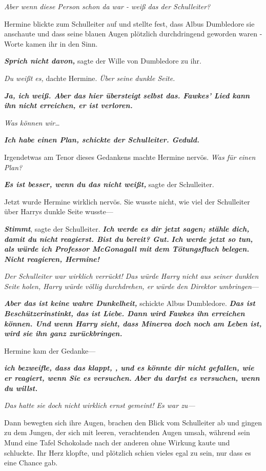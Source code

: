 {\emph{Aber wenn diese Person schon da war - weiß das der Schulleiter?}

Hermine blickte zum Schulleiter auf und stellte fest, dass Albus Dumbledore sie anschaute und dass seine blauen Augen plötzlich durchdringend geworden waren - Worte kamen ihr in den Sinn.

\textbf{\emph{Sprich nicht davon,}} sagte der Wille von Dumbledore zu ihr.

\emph{Du weißt es,} dachte Hermine. \emph{Über seine dunkle Seite.}

\textbf{\emph{Ja, ich weiß. Aber das hier übersteigt selbst das. Fawkes' Lied kann ihn nicht erreichen, er ist verloren.}}

\emph{Was können wir…}

\textbf{\emph{Ich habe einen Plan, schickte der Schulleiter. Geduld.}}

Irgendetwas am Tenor dieses Gedankens machte Hermine nervös. \emph{Was für einen Plan?}

\textbf{\emph{Es ist besser, wenn du das nicht weißt,}} sagte der Schulleiter.

Jetzt wurde Hermine wirklich nervös. Sie wusste nicht, wie viel der Schulleiter über Harrys dunkle Seite wusste—

\textbf{\emph{Stimmt}}, sagte der Schulleiter. \textbf{\emph{Ich werde es dir jetzt sagen; stähle dich, damit du nicht reagierst. Bist du bereit? Gut.}} \textbf{\emph{Ich werde jetzt so tun, als würde ich Professor McGonagall mit dem Tötungsfluch belegen. Nicht reagieren, Hermine!}}

\emph{Der Schulleiter war wirklich verrückt! Das würde Harry nicht aus seiner dunklen Seite holen, Harry würde völlig durchdrehen, er würde den Direktor umbringen}—

\textbf{\emph{Aber das ist keine wahre Dunkelheit,}} schickte Albus Dumbledore. \textbf{\emph{Das ist Beschützerinstinkt, das ist Liebe. Dann wird Fawkes ihn erreichen können. Und wenn Harry sieht, dass Minerva doch noch am Leben ist, wird sie ihn ganz zurückbringen.}}

Hermine kam der Gedanke—

\textbf{\emph{ich bezweifle, dass das klappt, , und es könnte dir nicht gefallen, wie er reagiert, wenn Sie es versuchen.}} \textbf{\emph{Aber du darfst es versuchen, wenn du willst.}}

\emph{Das hatte sie doch nicht wirklich ernst gemeint! Es war zu—}

Dann bewegten sich ihre Augen, brachen den Blick vom Schulleiter ab und gingen zu dem Jungen, der sich mit leeren, verachtenden Augen umsah, während sein Mund eine Tafel Schokolade nach der anderen ohne Wirkung kaute und schluckte. Ihr Herz klopfte, und plötzlich schien vieles egal zu sein, nur dass es eine Chance gab.

}
